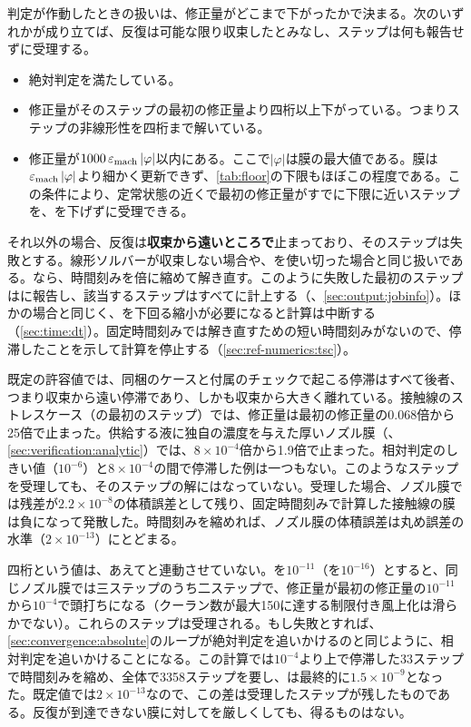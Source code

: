 判定が作動したときの扱いは、修正量がどこまで下がったかで決まる。次のいずれかが成り立てば、反復は可能な限り収束したとみなし、ステップは何も報告せずに受理する。

\begin{itemize}
  \item 絶対判定を満たしている。
  \item 修正量がそのステップの最初の修正量より四桁以上下がっている。つまりステップの非線形性を四桁まで解いている。
  \item 修正量が$1000\,\varepsilon_{\mathrm{mach}}\,\lvert\varphi\rvert$以内にある。ここで$\lvert\varphi\rvert$は膜の最大値である。膜は$\varepsilon_{\mathrm{mach}}\,\lvert\varphi\rvert$より細かく更新できず、\cref{tab:floor}の下限もほぼこの程度である。この条件により、定常状態の近くで最初の修正量がすでに下限に近いステップを、を下げずに受理できる。
\end{itemize}

それ以外の場合、反復は\textbf{収束から遠いところで}止まっており、そのステップは失敗とする。線形ソルバーが収束しない場合や、を使い切った場合と同じ扱いである。なら、時間刻みを倍に縮めて解き直す。このように失敗した最初のステップはに報告し、該当するステップはすべてに計上する（、\cref{sec:output:jobinfo}）。ほかの場合と同じく、を下回る縮小が必要になると計算は中断する（\cref{sec:time:dt}）。固定時間刻みでは解き直すための短い時間刻みがないので、停滞したことを示して計算を停止する（\cref{sec:ref-numerics:tsc}）。

既定の許容値では、同梱のケースと付属のチェックで起こる停滞はすべて後者、つまり収束から遠い停滞であり、しかも収束から大きく離れている。接触線のストレスケース（の最初のステップ）では、修正量は最初の修正量の0.068倍から25倍で止まった。供給する液に独自の濃度を与えた厚いノズル膜（、\cref{sec:verification:analytic}）では、$8\times10^{-4}$倍から1.9倍で止まった。相対判定のしきい値（$10^{-6}$）と$8\times10^{-4}$の間で停滞した例は一つもない。このようなステップを受理しても、そのステップの解にはなっていない。受理した場合、ノズル膜では残差が$2.2\times10^{-8}$の体積誤差として残り、固定時間刻みで計算した接触線の膜は負になって発散した。時間刻みを縮めれば、ノズル膜の体積誤差は丸め誤差の水準（$2\times10^{-13}$）にとどまる。

四桁という値は、あえてと連動させていない。を$10^{-11}$（を$10^{-16}$）とすると、同じノズル膜では三ステップのうち二ステップで、修正量が最初の修正量の$10^{-11}$から$10^{-4}$で頭打ちになる（クーラン数が最大150に達する制限付き風上化は滑らかでない）。これらのステップは受理される。もし失敗とすれば、\cref{sec:convergence:absolute}のループが絶対判定を追いかけるのと同じように、相対判定を追いかけることになる。この計算では$10^{-4}$より上で停滞した33ステップで時間刻みを縮め、全体で3358ステップを要し、は最終的に$1.5\times10^{-9}$となった。既定値では$2\times10^{-13}$なので、この差は受理したステップが残したものである。反復が到達できない膜に対してを厳しくしても、得るものはない。

